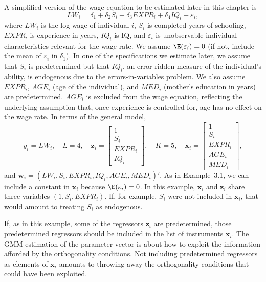 \begin{example}
\label{ex:3.2}
A simplified version of the wage equation to be estimated later in this chapter is
\[
  LW_i = \delta_1 + \delta_2 S_i + \delta_3 \mathit{EXPR}_i + \delta_4 \mathit{IQ}_i + \varepsilon_i,
\]
where $LW_i$ is the log wage of individual $i$, $S_i$ is completed years of schooling,
$\mathit{EXPR}_i$ is experience in years, $\mathit{IQ}_i$ is IQ, and $\varepsilon_i$ is unobservable individual
characteristics relevant for the wage rate.  We assume $\E(\varepsilon_i) = 0$ (if not,
include the mean of $\varepsilon_i$ in $\delta_1$).  In one of the specifications we estimate later, we
assume that $S_i$ is predetermined but that $\mathit{IQ}_i$, an error-ridden measure of the
individual's ability, is endogenous due to the errors-in-variables problem.  We
also assume $\mathit{EXPR}_i$, $\mathit{AGE}_i$ (age of the individual), and $\mathit{MED}_i$ (mother's
education in years) are predetermined.  $\mathit{AGE}_i$ is excluded from the wage equation,
reflecting the underlying assumption that, once experience is controlled
for, age has no effect on the wage rate.  In terms of the general model,
\[
  y_i = LW_i, \quad L = 4, \quad
  \mathbf{z}_i = \begin{bmatrix} 1 \\ S_i \\ \mathit{EXPR}_i \\ \mathit{IQ}_i \end{bmatrix}, \quad
  K = 5, \quad
  \mathbf{x}_i = \begin{bmatrix} 1 \\ S_i \\ \mathit{EXPR}_i \\ \mathit{AGE}_i \\ \mathit{MED}_i \end{bmatrix},
\]
and $\mathbf{w}_i = (LW_i, S_i, \mathit{EXPR}_i, \mathit{IQ}_i, \mathit{AGE}_i, \mathit{MED}_i)'$.
As in Example~3.1, we can include a constant in $\mathbf{x}_i$ because $\E(\varepsilon_i) = 0$.  In this
example, $\mathbf{x}_i$ and $\mathbf{z}_i$ share three variables $(1, S_i, \mathit{EXPR}_i)$.  If, for example,
$S_i$ were not included in $\mathbf{x}_i$, that would amount to treating $S_i$ as endogenous.
\end{example}

If, as in this example, some of the regressors $\mathbf{z}_i$ are predetermined, those predetermined
regressors should be included in the list of instruments $\mathbf{x}_i$.  The GMM
estimation of the parameter vector is about how to exploit the information afforded
by the orthogonality conditions.  Not including predetermined regressors as elements
of $\mathbf{x}_i$ amounts to throwing away the orthogonality conditions that could have
been exploited.

